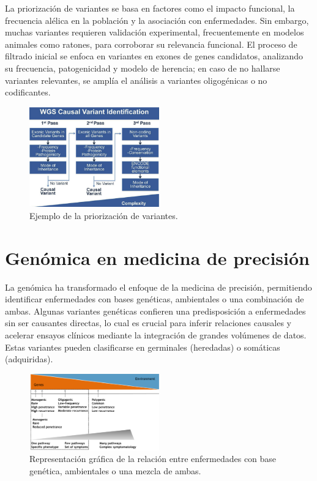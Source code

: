 La priorización de variantes se basa en factores como el impacto funcional, la frecuencia alélica en la población y la asociación con enfermedades. Sin embargo, muchas variantes requieren validación experimental, frecuentemente en modelos animales como ratones, para corroborar su relevancia funcional. El proceso de filtrado inicial se enfoca en variantes en exones de genes candidatos, analizando su frecuencia, patogenicidad y modelo de herencia; en caso de no hallarse variantes relevantes, se amplía el análisis a variantes oligogénicas o no codificantes.

\begin{figure}[htbp]
\centering
\includegraphics[width = 0.5\textwidth]{figs/variant-priorization.png}
\caption{Ejemplo de la priorización de variantes.}
\end{figure}

\section{Genómica en medicina de precisión}
La genómica ha transformado el enfoque de la medicina de precisión, permitiendo identificar enfermedades con bases genéticas, ambientales o una combinación de ambas. Algunas variantes genéticas confieren una predisposición a enfermedades sin ser causantes directas, lo cual es crucial para inferir relaciones causales y acelerar ensayos clínicos mediante la integración de grandes volúmenes de datos. Estas variantes pueden clasificarse en germinales (heredadas) o somáticas (adquiridas).

\begin{figure}[htbp]
\centering
\includegraphics[width = 0.5\textwidth]{figs/genetic-environment.png}
\caption{Representación gráfica de la relación entre enfermedades con base genética, ambientales o una mezcla de ambas.}
\end{figure}


